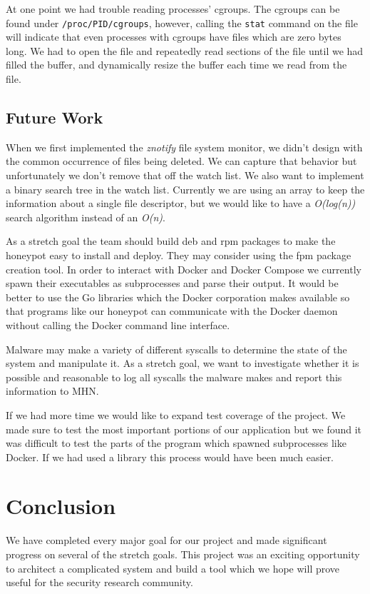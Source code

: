 \documentclass[10pt,conference,draftclsnofoot,onecolumn]{IEEEtran}
\begin{document}
At one point we had trouble reading processes’ cgroups. The cgroups can be found under \texttt{/proc/PID/cgroups}, however, calling the \texttt{stat} command on the file will indicate that even processes with cgroups have files which are zero bytes long. We had to open the file and repeatedly read sections of the file until we had filled the buffer, and dynamically resize the buffer each time we read from the file.

\subsection{Future Work}
When we first implemented the \textit{znotify} file system monitor, we didn’t design with the common occurrence of files being deleted. We can capture that behavior but unfortunately we don’t remove that off the watch list. We also want to implement a binary search tree in the watch list. Currently we are using an array to keep the information about a single file descriptor, but we would like to have a \textit{O(log(n))} search algorithm instead of an \textit{O(n)}.

As a stretch goal the team should build deb and rpm packages to make the honeypot easy to install and deploy. They may consider using the fpm package creation tool. 
In order to interact with Docker and Docker Compose we currently spawn their executables as subprocesses and parse their output. It would be better to use the Go libraries which the Docker corporation makes available so that programs like our honeypot can communicate with the Docker daemon without calling the Docker command line interface.

Malware may make a variety of different syscalls to determine the state of the system and manipulate it. As a stretch goal, we want to investigate whether it is possible and reasonable to log all syscalls the malware makes and report this information to MHN. 

If we had more time we would like to expand test coverage of the project. We made sure to test the most important portions of our application but we found it was difficult to test the parts of the program which spawned subprocesses like Docker. If we had used a library this process would have been much easier.

\section{Conclusion}
We have completed every major goal for our project and made significant progress on several of the stretch goals. This project was an exciting opportunity to architect a complicated system and  build a tool which we hope will prove useful for the security research community.

\bigskip
\end{document}
